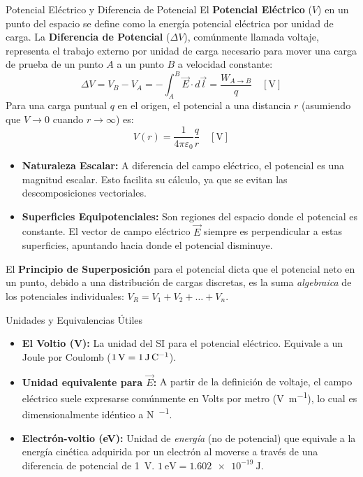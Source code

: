 \documentclass[11pt]{article}
\begin{document}
\crearEncabezado

\begin{boxTeoria}{Potencial Eléctrico y Diferencia de Potencial}
    El \textbf{Potencial Eléctrico} ($V$) en un punto del espacio se define como la energía potencial eléctrica por unidad de carga. La \textbf{Diferencia de Potencial} ($\Delta V$), comúnmente llamada voltaje, representa el trabajo externo por unidad de carga necesario para mover una carga de prueba de un punto $A$ a un punto $B$ a velocidad constante:
    \begin{equation*}
        \Delta V = V_B - V_A = -\int_{A}^{B} \vec{E} \cdot d\vec{l} = \frac{W_{A \to B}}{q} \quad [\unit{\V}]
    \end{equation*}
    Para una carga puntual $q$ en el origen, el potencial a una distancia $r$ (asumiendo que $V \to 0$ cuando $r \to \infty$) es:
    \begin{equation*}
        V(r) = \frac{1}{4\pi\varepsilon_0} \frac{q}{r} \quad [\unit{\V}]
    \end{equation*}
    \begin{itemize}
        \item \textbf{Naturaleza Escalar:} A diferencia del campo eléctrico, el potencial es una magnitud escalar. Esto facilita su cálculo, ya que se evitan las descomposiciones vectoriales.
        \item \textbf{Superficies Equipotenciales:} Son regiones del espacio donde el potencial es constante. El vector de campo eléctrico $\vec{E}$ siempre es perpendicular a estas superficies, apuntando hacia donde el potencial disminuye.
    \end{itemize}

    El \textbf{Principio de Superposición} para el potencial dicta que el potencial neto en un punto, debido a una distribución de cargas discretas, es la suma \textit{algebraica} de los potenciales individuales: $V_{R} = V_{1} + V_{2} + \dots + V_{n}$.
\end{boxTeoria}

\begin{boxNota}{Unidades y Equivalencias Útiles}
    \begin{itemize}
        \item \textbf{El Voltio (V):} La unidad del SI para el potencial eléctrico. Equivale a un Joule por Coulomb ($\qty{1}{\V} = \qty{1}{\J\per\C}$).
        \item \textbf{Unidad equivalente para $\vec{E}$:} A partir de la definición de voltaje, el campo eléctrico suele expresarse comúnmente en Volts por metro (\unit{\V\per\meter}), lo cual es dimensionalmente idéntico a \unit{\N\per\C}.
        \item \textbf{Electrón-voltio (\unit{\electronvolt}):} Unidad de \textit{energía} (no de potencial) que equivale a la energía cinética adquirida por un electrón al moverse a través de una diferencia de potencial de \qty{1}{\V}. $\qty{1}{\electronvolt} = \qty{1.602e-19}{\J}$.
    \end{itemize}
\end{boxNota}
\end{document}
